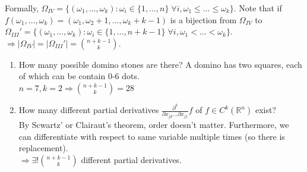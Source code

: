 \documentclass{article}
\begin{document}
\begin{enumerate}[label=(\Roman*)]
		Formally, $\Omega_{IV}=\{(\omega_1, \dots, \omega_k) : \omega_i\in\{1, \dots, n\}\;\forall i, \omega_1\leq\dots\leq\omega_k\}$. Note that if $f(\omega_1, \dots, \omega_k)=(\omega_1, \omega_2+1, \dots, \omega_k+k-1)$ is a bijection from $\Omega_{IV}$ to $\Omega_{III}'=\{(\omega_1, \dots, \omega_k) : \omega_i\in\{1, \dots, n+k-1\}\;\forall i, \omega_1<\dots<\omega_k\}$.\\
		$\Rightarrow|\Omega_{IV}|=|\Omega_{III}'|=\binom{n+k-1}{k}$.
		\begin{myex*}{}{}
			\begin{enumerate}
				\item How many possible domino stones are there? A domino has two squares, each of which can be contain 0-6 dots.\\
				$n=7, k=2\Rightarrow\binom{n+k-1}{k}=28$
				\item How many different partial derivatives $\frac{\partial^k}{\partial x_{jk}\dots\partial x_{j1}}f$ of $f\in C^k(\mathbb{R}^n)$ exist?\\
				
				By Scwartz' or Clairaut's theorem, order doesn't matter. Furthermore, we can differentiate with respect to same variable multiple times (so there is replacement).\\
				$\Rightarrow\exists!\binom{n+k-1}{k}$ different partial derivatives.
			\end{enumerate}
		\end{myex*}
	\end{enumerate}
	
	\newpage
\end{document}
